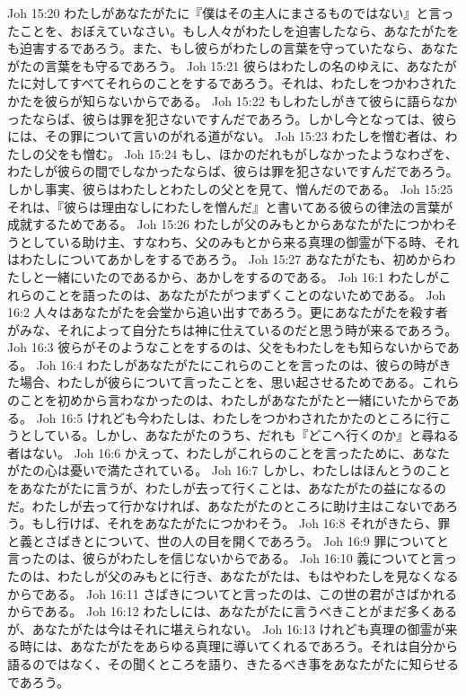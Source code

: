 Joh 15:20  わたしがあなたがたに『僕はその主人にまさるものではない』と言ったことを、おぼえていなさい。もし人々がわたしを迫害したなら、あなたがたをも迫害するであろう。また、もし彼らがわたしの言葉を守っていたなら、あなたがたの言葉をも守るであろう。
Joh 15:21  彼らはわたしの名のゆえに、あなたがたに対してすべてそれらのことをするであろう。それは、わたしをつかわされたかたを彼らが知らないからである。
Joh 15:22  もしわたしがきて彼らに語らなかったならば、彼らは罪を犯さないですんだであろう。しかし今となっては、彼らには、その罪について言いのがれる道がない。
Joh 15:23  わたしを憎む者は、わたしの父をも憎む。
Joh 15:24  もし、ほかのだれもがしなかったようなわざを、わたしが彼らの間でしなかったならば、彼らは罪を犯さないですんだであろう。しかし事実、彼らはわたしとわたしの父とを見て、憎んだのである。
Joh 15:25  それは、『彼らは理由なしにわたしを憎んだ』と書いてある彼らの律法の言葉が成就するためである。
Joh 15:26  わたしが父のみもとからあなたがたにつかわそうとしている助け主、すなわち、父のみもとから来る真理の御霊が下る時、それはわたしについてあかしをするであろう。
Joh 15:27  あなたがたも、初めからわたしと一緒にいたのであるから、あかしをするのである。
Joh 16:1  わたしがこれらのことを語ったのは、あなたがたがつまずくことのないためである。
Joh 16:2  人々はあなたがたを会堂から追い出すであろう。更にあなたがたを殺す者がみな、それによって自分たちは神に仕えているのだと思う時が来るであろう。
Joh 16:3  彼らがそのようなことをするのは、父をもわたしをも知らないからである。
Joh 16:4  わたしがあなたがたにこれらのことを言ったのは、彼らの時がきた場合、わたしが彼らについて言ったことを、思い起させるためである。これらのことを初めから言わなかったのは、わたしがあなたがたと一緒にいたからである。
Joh 16:5  けれども今わたしは、わたしをつかわされたかたのところに行こうとしている。しかし、あなたがたのうち、だれも『どこへ行くのか』と尋ねる者はない。
Joh 16:6  かえって、わたしがこれらのことを言ったために、あなたがたの心は憂いで満たされている。
Joh 16:7  しかし、わたしはほんとうのことをあなたがたに言うが、わたしが去って行くことは、あなたがたの益になるのだ。わたしが去って行かなければ、あなたがたのところに助け主はこないであろう。もし行けば、それをあなたがたにつかわそう。
Joh 16:8  それがきたら、罪と義とさばきとについて、世の人の目を開くであろう。
Joh 16:9  罪についてと言ったのは、彼らがわたしを信じないからである。
Joh 16:10  義についてと言ったのは、わたしが父のみもとに行き、あなたがたは、もはやわたしを見なくなるからである。
Joh 16:11  さばきについてと言ったのは、この世の君がさばかれるからである。
Joh 16:12  わたしには、あなたがたに言うべきことがまだ多くあるが、あなたがたは今はそれに堪えられない。
Joh 16:13  けれども真理の御霊が来る時には、あなたがたをあらゆる真理に導いてくれるであろう。それは自分から語るのではなく、その聞くところを語り、きたるべき事をあなたがたに知らせるであろう。
